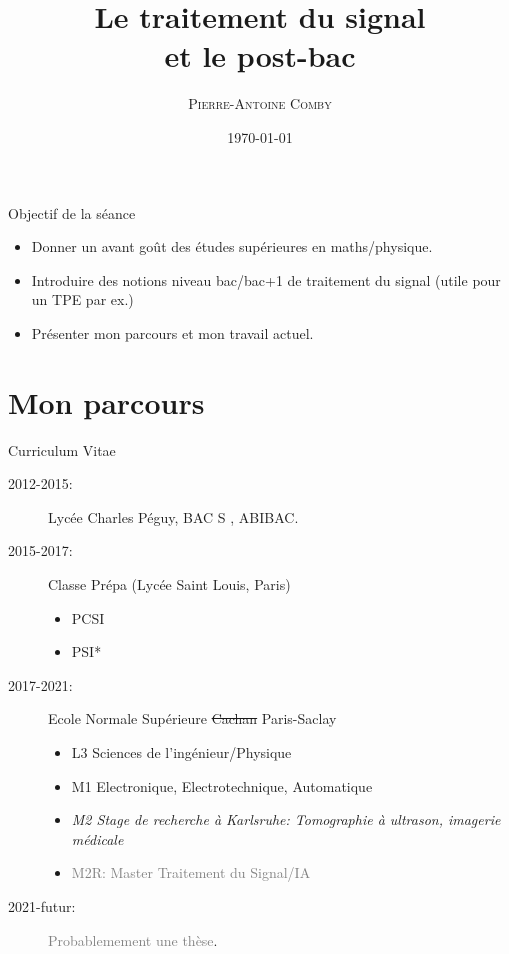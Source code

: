 \documentclass{beamer}
\title{Le traitement du signal \\et le post-bac}
\subtitle{}
\author[]{\textsc{Pierre-Antoine Comby}}
\institute{pierre-antoine.comby@ens-paris-saclay.fr}
\date{\today}
\begin{document}
\begin{frame}
   \titlepage
\end{frame}

\begin{frame}{Objectif de la séance}
  \begin{itemize}
    \item Donner un avant goût des études supérieures en maths/physique.
    \item Introduire des notions niveau bac/bac+1 de traitement du signal (utile pour un TPE par ex.)
    \item Présenter mon parcours et mon travail actuel.
  \end{itemize}
\end{frame}

\section{Mon parcours}
\label{sec:label}
\begin{frame}{Curriculum Vitae}
  \begin{description}
    \item[2012-2015:] Lycée Charles Péguy, BAC S , ABIBAC.
    \item[2015-2017:] Classe Prépa (Lycée Saint Louis, Paris)
      \begin{itemize}
        \item PCSI
        \item PSI*
      \end{itemize}
    \item[2017-2021:] Ecole Normale Supérieure \sout{Cachan} Paris-Saclay
      \begin{itemize}
        \item L3 Sciences de l'ingénieur/Physique
        \item M1 Electronique, Electrotechnique, Automatique
        \item \textit{M2 Stage de recherche à Karlsruhe: Tomographie à ultrason, imagerie médicale}
        \item \textcolor{gray}{M2R: Master Traitement du Signal/IA}
      \end{itemize}
    \item[2021-futur:] \textcolor{gray}{Probablemement une thèse}.
  \end{description}
\end{frame}
\end{document}
